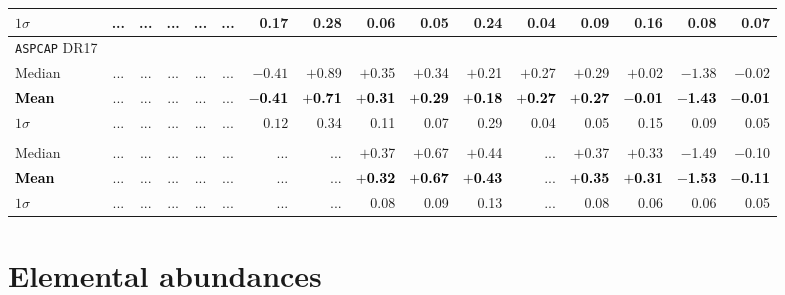 \documentclass[longauth]{aa} %
\begin{document}
\begin{table*}
\begin{small}
\begin{center}
\begin{tabular}{lcccccrrrrrrrrrr}
				$1\sigma$       &  ... & ...  & ...  & ...   &  ... &    0.17      &  0.28  & 0.06 & 0.05 & 0.24 & 0.04   & 0.09  & 0.16  & 0.08      & 0.07 \\   
				\hline
				\hline	
				{ \texttt{ASPCAP} DR17}			&  &     &  &  &    &  &  &  &   & &  & & &   &  \\
				\hline
				\hline					
Median              & ...  & ...  & ...  &  ...  &  ... & $-0.41$  & $+$0.89   & $+$0.35  & $+$0.34 & $+$0.21  & $+$0.27  & $+$0.29  & $+$0.02  & $-1.38$  & $-0.02$  \\ 
\rowcolor{pink}
\textcolor{black}{\bf  Mean}                  &  ... & ...  &  ... &  ...  &  ... & \textcolor{black}{\bf $-$0.41}  & \textcolor{black}{\bf $+$0.71}   & \textcolor{black}{\bf $+$0.31}  & \textcolor{black}{\bf $+$0.29} & \textcolor{black}{\bf $+$0.18}  & \textcolor{black}{\bf $+$0.27}  & \textcolor{black}{\bf $+$0.27}  & \textcolor{black}{\bf $-$0.01} & \textcolor{black}{\bf $-$1.43}  & \textcolor{black}{\bf $-$0.01}  \\ 
$1\sigma$       &  ... & ...  & ...  & ...   &  ... & $0.12$   & 0.34   & 0.11  & 0.07 & 0.29  & 0.04  & 0.05  & 0.15   & 0.09    & 0.05 \\   
\hline
\hline
\citet{Villanova2019}			&  &     &  &  &    &  &  &  &   & &  & & &   &  \\
\hline
\hline				
 Median                  &  ... &  ... &  ... &  ...  &  ... & ... &  ... & $+$0.37  &  $+$0.67 &  $+$0.44 & ...  &  $+$0.37  &  $+$0.33 & $-$1.49 &  $-$0.10  \\ 
\rowcolor{pink}
\textcolor{black}{\bf Mean}                  &  ... &  ... &  ... &  ...  &  ... & ... &  ... & \textcolor{black}{\bf $+$0.32}  & \textcolor{black}{\bf $+$0.67} & \textcolor{black}{\bf $+$0.43}  & ...  & \textcolor{black}{\bf $+$0.35}  & \textcolor{black}{\bf $+$0.31} & \textcolor{black}{\bf $-$1.53}  & \textcolor{black}{\bf  $-$0.11}  \\ 
 $1\sigma$                    &  ... &  ... &  ... &  ...  &  ... & ... &  ... & 0.08  &  0.09 &  0.13 & ...  &  0.08  &  0.06 & 0.06 &  0.05  \\ 
\hline
\hline
			\end{tabular}  \label{Table1b}
		\end{center}
	\end{small}
\end{table*}   

 \section{Elemental abundances}
 \label{sectionElementalAbundances}
 
\end{document}
